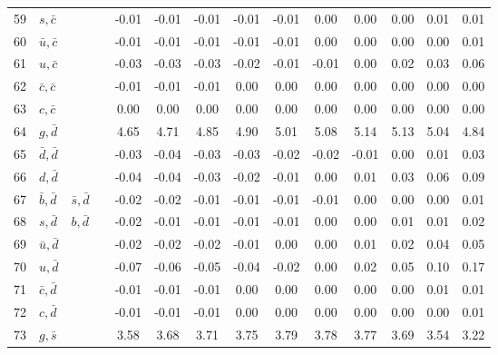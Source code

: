 \begin{tabularx}{\textwidth}{rXXX@{}S@{}S@{}S@{}S@{}S@{}S@{}S@{}S@{}S@{}S}
 59 & $s, \bar c$      &                   &                  & -0.01 & -0.01 & -0.01 & -0.01 & -0.01 &  0.00 &  0.00 &  0.00 &  0.01 &  0.01 \\
 60 & $\bar u, \bar c$ &                   &                  & -0.01 & -0.01 & -0.01 & -0.01 & -0.01 &  0.00 &  0.00 &  0.00 &  0.00 &  0.01 \\
 61 & $u, \bar c$      &                   &                  & -0.03 & -0.03 & -0.03 & -0.02 & -0.01 & -0.01 &  0.00 &  0.02 &  0.03 &  0.06 \\
 62 & $\bar c, \bar c$ &                   &                  & -0.01 & -0.01 & -0.01 &  0.00 &  0.00 &  0.00 &  0.00 &  0.00 &  0.00 &  0.00 \\
 63 & $c, \bar c$      &                   &                  &  0.00 &  0.00 &  0.00 &  0.00 &  0.00 &  0.00 &  0.00 &  0.00 &  0.00 &  0.00 \\
 64 & $g, \bar d$      &                   &                  &  4.65 &  4.71 &  4.85 &  4.90 &  5.01 &  5.08 &  5.14 &  5.13 &  5.04 &  4.84 \\
 65 & $\bar d, \bar d$ &                   &                  & -0.03 & -0.04 & -0.03 & -0.03 & -0.02 & -0.02 & -0.01 &  0.00 &  0.01 &  0.03 \\
 66 & $d, \bar d$      &                   &                  & -0.04 & -0.04 & -0.03 & -0.02 & -0.01 &  0.00 &  0.01 &  0.03 &  0.06 &  0.09 \\
 67 & $\bar b, \bar d$ & $\bar s, \bar d$  &                  & -0.02 & -0.02 & -0.01 & -0.01 & -0.01 & -0.01 &  0.00 &  0.00 &  0.00 &  0.01 \\
 68 & $s, \bar d$      & $b, \bar d$       &                  & -0.02 & -0.01 & -0.01 & -0.01 & -0.01 &  0.00 &  0.00 &  0.01 &  0.01 &  0.02 \\
 69 & $\bar u, \bar d$ &                   &                  & -0.02 & -0.02 & -0.02 & -0.01 &  0.00 &  0.00 &  0.01 &  0.02 &  0.04 &  0.05 \\
 70 & $u, \bar d$      &                   &                  & -0.07 & -0.06 & -0.05 & -0.04 & -0.02 &  0.00 &  0.02 &  0.05 &  0.10 &  0.17 \\
 71 & $\bar c, \bar d$ &                   &                  & -0.01 & -0.01 & -0.01 &  0.00 &  0.00 &  0.00 &  0.00 &  0.00 &  0.01 &  0.01 \\
 72 & $c, \bar d$      &                   &                  & -0.01 & -0.01 & -0.01 &  0.00 &  0.00 &  0.00 &  0.00 &  0.00 &  0.00 &  0.01 \\
 73 & $g, \bar s$      &                   &                  &  3.58 &  3.68 &  3.71 &  3.75 &  3.79 &  3.78 &  3.77 &  3.69 &  3.54 &  3.22 \\

\end{tabularx}
